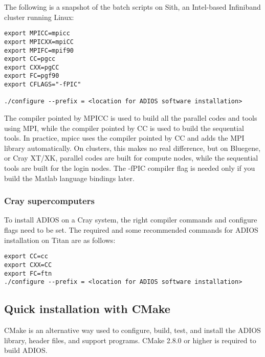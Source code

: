 The following is a snapshot of the batch scripts on Sith, an Intel-based Infiniband
cluster running Linux:

\begin{lstlisting}
export MPICC=mpicc
export MPICXX=mpiCC
export MPIFC=mpif90
export CC=pgcc
export CXX=pgCC
export FC=pgf90
export CFLAGS="-fPIC"

./configure --prefix = <location for ADIOS software installation>
\end{lstlisting}


The compiler pointed by MPICC is used to build all the parallel codes and tools
using MPI, while the compiler pointed by CC is used to build the sequential tools.
In practice, mpicc uses the compiler pointed by CC and adds the MPI library automatically.
On clusters, this makes no real difference, but on Bluegene, or Cray XT/XK, parallel
codes are built for compute nodes, while the sequential tools are built for the
login nodes. The -fPIC compiler flag is needed only if you build the
Matlab language bindings later.


\subsubsection{Cray supercomputers}

To install ADIOS on a Cray system, the right compiler commands and configure flags
need to be set. The required and some recommended commands for ADIOS installation on
Titan are as follows:

\begin{lstlisting}
export CC=cc
export CXX=CC
export FC=ftn
./configure --prefix = <location for ADIOS software installation>
\end{lstlisting}

\subsection{Quick installation with CMake}

CMake is an alternative way used to configure, build, test, and install the ADIOS library,
header files, and support programs. CMake 2.8.0 or higher is required to build ADIOS.


